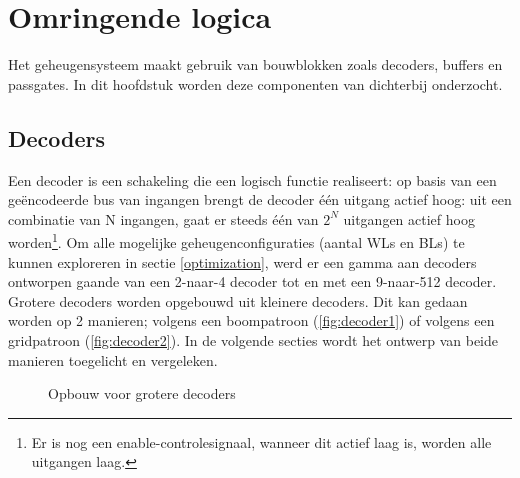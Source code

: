 \chapter{Omringende logica}
\label{periphery}

Het geheugensysteem maakt gebruik van bouwblokken zoals decoders, buffers en passgates.
In dit hoofdstuk worden deze componenten van dichterbij onderzocht.

\section{Decoders}
Een decoder is een schakeling die een logisch functie realiseert: op basis van een geëncodeerde bus van ingangen brengt de decoder één uitgang actief hoog: uit een combinatie van N ingangen, gaat er steeds één van $2^N$ uitgangen actief hoog worden\footnote{Er is nog een enable-controlesignaal, wanneer dit actief laag is, worden alle uitgangen laag.}. Om alle mogelijke geheugenconfiguraties (aantal WLs en BLs) te kunnen exploreren in sectie \ref{optimization}, werd er een gamma aan decoders ontworpen gaande van een 2-naar-4 decoder tot en met een 9-naar-512 decoder. Grotere decoders worden opgebouwd uit kleinere decoders. Dit kan gedaan worden op 2 manieren; volgens een boompatroon (\ref{fig:decoder1}) of volgens een gridpatroon (\ref{fig:decoder2}). In de volgende secties wordt het ontwerp van beide manieren toegelicht en vergeleken.

\begin{figure}[!ht]
\centering
{}
\caption[Types decoders]{Opbouw voor grotere decoders}\label{fig:basisdecoders}
\end{figure}

